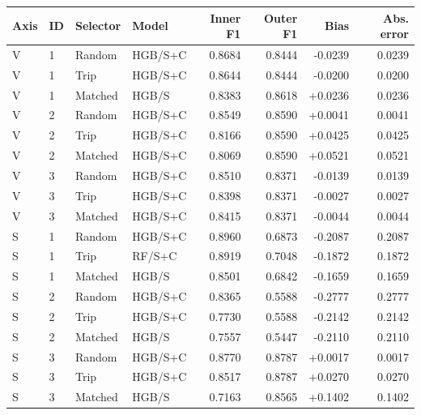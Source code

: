 \begin{singlespace}\small
\noindent\begin{minipage}{\linewidth}
\centering
{}
\begin{tabular}{@{}l l l l r r r r@{}}
\toprule Axis & ID & Selector & Model & Inner F1 & Outer F1 & Bias & Abs. error \\ \midrule
V & 1 & Random & HGB/S+C & 0.8684 & 0.8444 & -0.0239 & 0.0239 \\
V & 1 & Trip & HGB/S+C & 0.8644 & 0.8444 & -0.0200 & 0.0200 \\
V & 1 & Matched & HGB/S & 0.8383 & 0.8618 & +0.0236 & 0.0236 \\
V & 2 & Random & HGB/S+C & 0.8549 & 0.8590 & +0.0041 & 0.0041 \\
V & 2 & Trip & HGB/S+C & 0.8166 & 0.8590 & +0.0425 & 0.0425 \\
V & 2 & Matched & HGB/S+C & 0.8069 & 0.8590 & +0.0521 & 0.0521 \\
V & 3 & Random & HGB/S+C & 0.8510 & 0.8371 & -0.0139 & 0.0139 \\
V & 3 & Trip & HGB/S+C & 0.8398 & 0.8371 & -0.0027 & 0.0027 \\
V & 3 & Matched & HGB/S+C & 0.8415 & 0.8371 & -0.0044 & 0.0044 \\
S & 1 & Random & HGB/S+C & 0.8960 & 0.6873 & -0.2087 & 0.2087 \\
S & 1 & Trip & RF/S+C & 0.8919 & 0.7048 & -0.1872 & 0.1872 \\
S & 1 & Matched & HGB/S & 0.8501 & 0.6842 & -0.1659 & 0.1659 \\
S & 2 & Random & HGB/S+C & 0.8365 & 0.5588 & -0.2777 & 0.2777 \\
S & 2 & Trip & HGB/S+C & 0.7730 & 0.5588 & -0.2142 & 0.2142 \\
S & 2 & Matched & HGB/S & 0.7557 & 0.5447 & -0.2110 & 0.2110 \\
S & 3 & Random & HGB/S+C & 0.8770 & 0.8787 & +0.0017 & 0.0017 \\
S & 3 & Trip & HGB/S+C & 0.8517 & 0.8787 & +0.0270 & 0.0270 \\
S & 3 & Matched & HGB/S & 0.7163 & 0.8565 & +0.1402 & 0.1402 \\
\bottomrule\end{tabular}
\end{minipage}
\end{singlespace}
\par\medskip
\par\medskip
